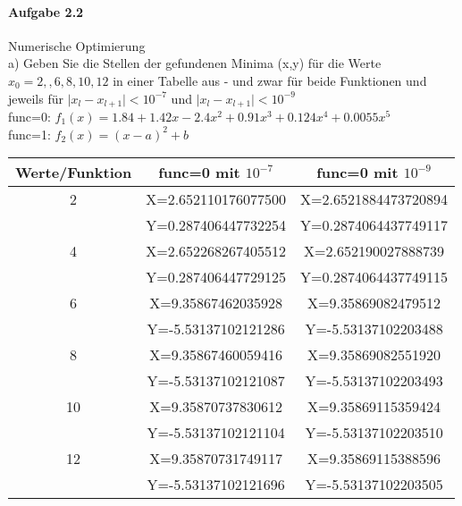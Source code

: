 \documentclass[paper=a4, fontsize=11pt]{scrartcl}
\numberwithin{equation}{section}
\numberwithin{figure}{section}
\numberwithin{table}{section}
\begin{document}
\paragraph{Aufgabe 2.2} Numerische Optimierung \\

a) Geben Sie die Stellen der gefundenen Minima (x,y) für die Werte $x_{0}=2,,6,8,10,12$ in einer Tabelle aus - und zwar für beide Funktionen und jeweils für $\vert x_{l}-x_{l+1} \vert < 10^{-7}$ und $ \vert x_{l}-x_{l+1} \vert < 10^{-9}$\\

func=0: $f_{1}(x)=1.84+1.42x-2.4x^{2}+0.91x^{3}+0.124x^{4}+0.0055x^{5}$\\
func=1: $f_{2}(x)=(x-a)^{2}+b$ \\

\begin{tabular}{|c|c|c|}
  \hline
   Werte/Funktion & func=0 mit $10^{-7}$ & func=0 mit $10^{-9}$ \\ 
   \hline
   2 & X=2.652110176077500  & X=2.6521884473720894   \\ 
     & Y=0.287406447732254 & Y=0.2874064437749117 \\
   \hline
   4 & X=2.652268267405512  & X=2.652190027888739   \\ 
     & Y=0.287406447729125 & Y=0.2874064437749115 \\
   \hline
   6 & X=9.35867462035928 & X=9.35869082479512   \\ 
     & Y=-5.53137102121286 & Y=-5.53137102203488  \\
   \hline
   8 & X=9.35867460059416  & X=9.35869082551920 \\ 
     & Y=-5.53137102121087 & Y=-5.53137102203493 \\
   \hline
   10 & X=9.35870737830612  & X=9.35869115359424 \\ 
      & Y=-5.53137102121104 & Y=-5.53137102203510 \\
   \hline
   12 & X=9.35870731749117  & X=9.35869115388596 \\ 
      & Y=-5.53137102121696 & Y=-5.53137102203505 \\
   \hline 
 \end{tabular}
 \\
 
\end{document}
